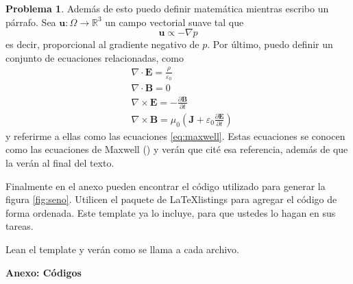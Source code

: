 \documentclass[10pt]{article}
\theoremstyle{definition}
\theoremstyle{remark}
\theoremstyle{definition}
\newtheorem{prob}{Problema}
\newcommand{\pd}[2]{\frac{\partial #1}{ \partial #2}}   %
\renewcommand{\vec}[1]{\boldsymbol{#1}}
\newcommand{\R}{\mathbb{R}}
\begin{document}
\begin{prob}
Además de esto puedo definir matemática mientras escribo un párrafo. Sea $\vec{u} : \Omega \to \R^{3}$ un campo vectorial suave tal que
\begin{equation}
	\vec{u} \propto -\nabla p
\end{equation}
es decir, proporcional al gradiente negativo de $p$. Por último, puedo definir un conjunto de ecuaciones relacionadas, como
\begin{subequations}
	\label{eq:maxwell}
	\begin{align}
		& \nabla \cdot \vec{E} = \frac{\rho}{\varepsilon_{0}} \\
		& \nabla \cdot \vec{B} = 0 \\
		& \nabla \times \vec{E} = -\pd{\vec{B}}{t} \\
		& \nabla \times \vec{B} = \mu_{0} \left( \vec{J} + \varepsilon_{0} \pd{\vec{E}}{t} \right)
	\end{align}
\end{subequations}
y referirme a ellas como las ecuaciones \eqref{eq:maxwell}. Estas ecuaciones se conocen como las ecuaciones de Maxwell (\cite{wikipedia}) y verán que cité esa referencia, además de que la verán al final del texto.

Finalmente en el anexo pueden encontrar el código utilizado para generar la figura \ref{fig:seno}. Utilicen el paquete de \LaTeX listings para agregar el código de forma ordenada. Este template ya lo incluye, para que ustedes lo hagan en sus tareas.

Lean el template y verán como se llama a cada archivo.

\end{prob}

\newpage

\printbibliography

\newpage

\twocolumn
\begin{center}
	\textbf{Anexo: Códigos}
\end{center}


\end{document}

